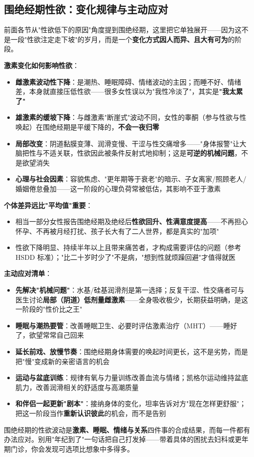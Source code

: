 \subsection{围绝经期性欲：变化规律与主动应对}

前面各节从"性欲低下的原因"角度提到围绝经期，这里把它单独展开——因为这不是一段"性欲注定走下坡"的岁月，而是一个\textbf{变化方式因人而异、且大有可为}的阶段。

\vspace{0.5em}
\noindent\textbf{激素变化如何影响性欲}：

\begin{itemize}
	\item \textbf{雌激素波动性下降}：是潮热、睡眠障碍、情绪波动的主因；而睡不好、情绪差，本身就直接压低性欲——很多女性误以为"我性冷淡了"，其实是\textbf{"我太累了"}
	\item \textbf{雄激素的缓坡下降}：与雌激素"断崖式"波动不同，女性的睾酮（参与性欲与性唤起）在围绝经期是平缓下降的，\textbf{不会一夜归零}
	\item \textbf{局部改变}：阴道黏膜变薄、润滑变慢、干涩与性交痛增多——"身体报警"让大脑把性与不适关联，性欲因此被条件反射式地抑制；这是\textbf{可逆的机械问题}，不是欲望消失
	\item \textbf{心理与社会因素}：容貌焦虑、"更年期等于衰老"的暗示、子女离家/照顾老人/婚姻倦怠叠加——这一阶段的心理负荷常被低估，其影响不亚于激素
\end{itemize}

\vspace{0.5em}
\noindent\textbf{个体差异远比"平均值"重要}：

\begin{itemize}
	\item 相当一部分女性报告围绝经期及绝经后\textbf{性欲回升、性满意度提高}——不再担心怀孕、不再被月经打扰、孩子长大有了二人世界，都是真实的"加项"
	\item 性欲下降明显、持续半年以上且带来痛苦者，才构成需要评估的问题（参考 HSDD 标准）；"比二十岁时少了"不是病，"想到性就烦躁回避"才值得就医
\end{itemize}

\vspace{0.5em}
\noindent\textbf{主动应对清单}：

\begin{itemize}
	\item \textbf{先解决"机械问题"}：水基/硅基润滑剂是第一选择；反复干涩、性交痛者可与医生讨论\textbf{局部（阴道）低剂量雌激素}——全身吸收极少，长期获益明确，是这一阶段的"性价比之王"
	\item \textbf{睡眠与潮热要管}：改善睡眠卫生、必要时评估激素治疗（MHT）——睡好了，欲望常常自己回来
	\item \textbf{延长前戏、放慢节奏}：围绝经期身体需要的唤起时间更长，这不是劣势，而是把"慢"变成新的亲密语言的机会
	\item \textbf{运动与盆底训练}：规律有氧与力量训练改善血流与情绪；凯格尔运动维持盆底肌力，改善润滑相关的舒适度与高潮质量
	\item \textbf{和伴侣一起更新"剧本"}：接纳身体的变化，坦率告诉对方"现在怎样更舒服"；把这一阶段当作\textbf{重新认识彼此}的机会，而不是告别
\end{itemize}

\begin{tcolorbox}[colback=pink!5!white,colframe=red!50!black,title=贴心小叮咛]
围绝经期的性欲波动是\textbf{激素、睡眠、情绪与关系}四件事的合成结果，而每一件都有办法应对。别用"年纪到了"一句话把自己打发掉——带着具体的困扰去妇科或更年期门诊，你会发现可选项比想象中多得多。
\end{tcolorbox}

